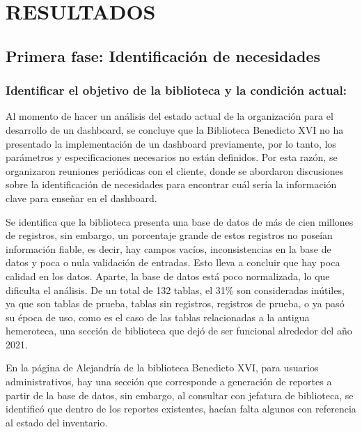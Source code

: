 \documentclass[spanish]{ieee_upb}
\begin{document}
\newpage
\section{RESULTADOS}


\subsection{Primera fase: Identificación de necesidades}

\subsubsection{Identificar el objetivo de la biblioteca y la condición actual:}
Al momento de hacer un análisis del estado actual de la organización para el desarrollo de un dashboard, se concluye que la Biblioteca Benedicto XVI no ha presentado la implementación de un dashboard previamente, por lo tanto, los parámetros y especificaciones necesarios no están definidos. Por esta razón, se organizaron reuniones periódicas con el cliente, donde se abordaron discusiones sobre la identificación de necesidades para encontrar cuál sería la información clave para enseñar en el dashboard.

\vspace{0.3cm}
Se identifica que la biblioteca presenta una base de datos de más de cien millones de registros, sin embargo, un porcentaje grande de estos registros no poseían información fiable, es decir, hay campos vacíos, inconsistencias en la base de datos y poca o nula validación de entradas. Esto lleva a concluir que hay poca calidad en los datos. Aparte, la base de datos está poco normalizada, lo que dificulta el análisis. De un total de 132 tablas, el 31\% son consideradas inútiles, ya que son tablas de prueba, tablas sin registros, registros de prueba, o ya pasó su época de uso, como es el caso de las tablas relacionadas a la antigua hemeroteca, una sección de biblioteca que dejó de ser funcional alrededor del año 2021. 

\vspace{0.3cm}
En la página de Alejandría de la biblioteca Benedicto XVI, para usuarios administrativos, hay una sección que corresponde a generación de reportes a partir de la base de datos, sin embargo, al consultar con jefatura de biblioteca, se identificó que dentro de los reportes existentes, hacían falta algunos con referencia al estado del inventario. 
\end{document}

